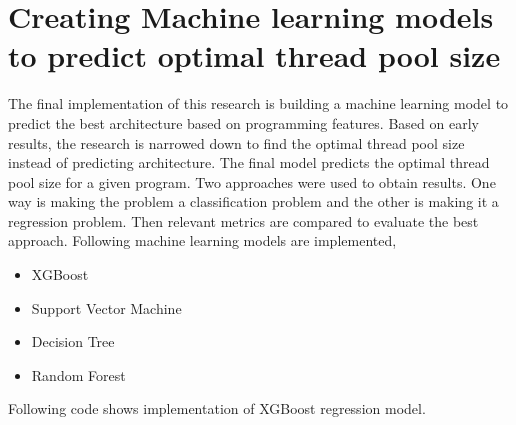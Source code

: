 \section{Creating Machine learning models to predict optimal thread pool size}

The final implementation of this research is building a machine learning model to predict the best architecture based on programming features. Based on early results, the research is narrowed down to find the optimal thread pool size instead of predicting architecture. The final model predicts the optimal thread pool size for a given program. Two approaches were used to obtain results. One way is making the problem a classification problem and the other is making it a regression problem. Then relevant metrics are compared to evaluate the best approach. Following machine learning models are implemented,
\begin{itemize}
	
	\item XGBoost
	\item Support Vector Machine
	\item Decision Tree
	\item Random Forest
	
\end{itemize}

Following code shows implementation of XGBoost regression model.

